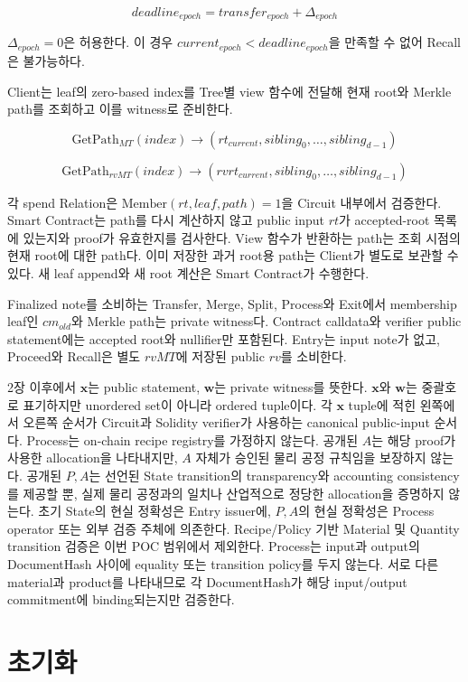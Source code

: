 \documentclass[11pt,a4paper]{extarticle}
\begin{document}
\[
deadline_{epoch}=transfer_{epoch}+\Delta_{epoch}
\]

$\Delta_{epoch}=0$은 허용한다. 이 경우
$current_{epoch}<deadline_{epoch}$을 만족할 수 없어 Recall은 불가능하다.

Client는 leaf의 zero-based index를 Tree별 view 함수에 전달해 현재 root와 Merkle path를
조회하고 이를 witness로 준비한다.

\[
\mathrm{GetPath}_{MT}(index)\to(rt_{current},sibling_0,\ldots,sibling_{d-1})
\]

\[
\mathrm{GetPath}_{rvMT}(index)\to(rvrt_{current},sibling_0,\ldots,sibling_{d-1})
\]

각 spend Relation은 $\mathrm{Member}(rt,leaf,path)=1$을 Circuit 내부에서 검증한다.
Smart Contract는 path를 다시 계산하지 않고 public input $rt$가 accepted-root 목록에
있는지와 proof가 유효한지를 검사한다. View 함수가 반환하는 path는 조회 시점의 현재
root에 대한 path다. 이미 저장한 과거 root용 path는 Client가 별도로 보관할 수 있다.
새 leaf append와 새 root 계산은 Smart Contract가 수행한다.

Finalized note를 소비하는 Transfer, Merge, Split, Process와 Exit에서 membership leaf인
$cm_{old}$와 Merkle path는 private witness다. Contract calldata와 verifier public
statement에는 accepted root와 nullifier만 포함된다. Entry는 input note가 없고,
Proceed와 Recall은 별도 $rvMT$에 저장된 public $rv$를 소비한다.

2장 이후에서 $\mathbf{x}$는 public statement, $\mathbf{w}$는 private witness를 뜻한다.
$\mathbf{x}$와 $\mathbf{w}$는 중괄호로 표기하지만 unordered set이 아니라 ordered tuple이다.
각 $\mathbf{x}$ tuple에 적힌 왼쪽에서 오른쪽 순서가 Circuit과 Solidity verifier가
사용하는 canonical public-input 순서다.
Process는 on-chain recipe registry를 가정하지 않는다. 공개된 $A$는 해당 proof가
사용한 allocation을 나타내지만, $A$ 자체가 승인된 물리 공정 규칙임을 보장하지 않는다.
공개된 $P,A$는 선언된 State transition의 transparency와 accounting consistency를
제공할 뿐, 실제 물리 공정과의 일치나 산업적으로 정당한 allocation을 증명하지 않는다.
초기 State의 현실 정확성은 Entry issuer에, $P,A$의 현실 정확성은 Process operator 또는
외부 검증 주체에 의존한다. Recipe/Policy 기반 Material 및 Quantity transition 검증은
이번 POC 범위에서 제외한다.
Process는 input과 output의 DocumentHash 사이에 equality 또는 transition policy를
두지 않는다. 서로 다른 material과 product를 나타내므로 각 DocumentHash가 해당
input/output commitment에 binding되는지만 검증한다.

\section{초기화}
\end{document}

